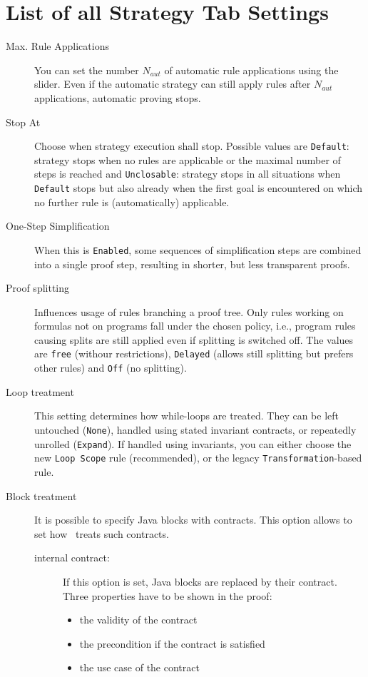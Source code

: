 \section{List of all Strategy Tab Settings}
\label{app:strategy}
    \begin{description}
    \item[Max. Rule Applications] You can set the number $N_{aut}$ of
      automatic rule applications using the slider. Even if the
      automatic strategy can still apply rules after $N_{aut}$
      applications, automatic proving stops. 
    \item[Stop At] Choose when strategy execution shall stop.
      Possible values are \texttt{Default}: strategy stops when no
      rules are applicable or the maximal number of steps is reached and
      \texttt{Unclosable}: strategy stops in all situations when
      \texttt{Default} stops but also already when the first goal is
      encountered on which no further rule is (automatically) applicable. 
      
    \item[One-Step Simplification] When this is \texttt{Enabled}, some sequences of simplification
    steps are combined into a single proof step, resulting in shorter, but less transparent proofs.

    \item[Proof splitting] Influences usage of rules branching a
      proof tree. Only rules working on formulas not on
      programs fall under the chosen policy, i.e., program rules
      causing
      splits are still applied even if splitting is switched off. The
      values are \texttt{free} (withour restrictions), \texttt{Delayed}
      (allows still splitting but prefers other rules) and \texttt{Off} (no
      splitting).

    \item[Loop treatment] This setting determines how while-loops are
treated. They can be left untouched (\texttt{None}), handled
using stated invariant contracts, or
repeatedly unrolled (\texttt{Expand}). If handled using invariants,
you can either choose the new \texttt{Loop Scope} rule (recommended),
or the legacy \texttt{Transformation}-based rule.
    
     \item[Block treatment] It is possible to specify Java blocks with contracts. 
This option allows to set how \KeY\ treats such contracts.
\begin{description}
	\item[internal contract:] If this option is set, Java blocks are replaced by their contract.
	Three properties have to be shown in the proof:
	\begin{itemize}
		\item the validity of the contract
		\item the precondition if the contract is satisfied
		\item the use case of the contract
	\end{itemize}
	

\end{description}
\end{description}

